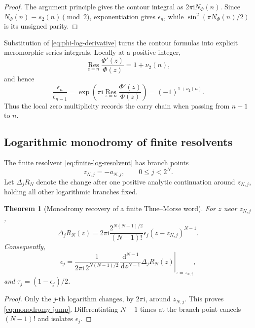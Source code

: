 \documentclass[11pt,oneside]{article}
\newtheorem{theorem}{Theorem}[section]
\theoremstyle{definition}
\newcommand{\dd}{\,\mathrm d}
\newcommand{\ii}{\mathrm i}
\newcommand{\Res}{\operatorname*{Res}}
\newcommand{\vTwo}{\nu_2}
\begin{document}
\begin{proof}
The argument principle gives the contour integral as \(2\pi\ii N_\Phi(n)\). Since
\(N_\Phi(n)\equiv s_2(n)\pmod2\), exponentiation gives \(\epsilon_n\), while
\(\sin^2(\pi N_\Phi(n)/2)\) is its unsigned parity.
\end{proof}

Substitution of \eqref{eq:phi-log-derivative} turns the contour formulas into explicit
meromorphic series integrals. Locally at a positive integer,
\begin{equation}
 \Res_{z=n}\frac{\Phi'(z)}{\Phi(z)}=1+\vTwo(n),
 \label{eq:local-residue}
\end{equation}
and hence
\begin{equation}
 \frac{\epsilon_n}{\epsilon_{n-1}}
 =\exp\left(\pi\ii\Res_{z=n}\frac{\Phi'(z)}{\Phi(z)}\right)
 =(-1)^{1+\vTwo(n)}.
 \label{eq:local-TM-ratio}
\end{equation}
Thus the local zero multiplicity records the carry chain when passing from \(n-1\) to \(n\).

\subsection{Logarithmic monodromy of finite resolvents}

The finite resolvent \eqref{eq:finite-log-resolvent} has branch points
\begin{equation}
 z_{N,j}=-a_{N,j},\qquad 0\le j<2^N.
 \label{eq:branch-points}
\end{equation}
Let \(\Delta_jR_N\) denote the change after one positive analytic continuation around
\(z_{N,j}\), holding all other logarithmic branches fixed.

\begin{theorem}[Monodromy recovery of a finite Thue--Morse word]
\label{thm:monodromy-TM}
For \(z\) near \(z_{N,j}\),
\begin{equation}
 \Delta_jR_N(z)=2\pi\ii\frac{2^{N(N-1)/2}}{(N-1)!}
 \epsilon_j(z-z_{N,j})^{N-1}.
 \label{eq:monodromy-jump}
\end{equation}
Consequently,
\begin{equation}
 \boxed{\displaystyle
 \epsilon_j=\frac{1}{2\pi\ii\,2^{N(N-1)/2}}
 \left.\frac{\dd^{N-1}}{\dd z^{N-1}}\Delta_jR_N(z)\right|_{z=z_{N,j}},}
 \label{eq:epsilon-monodromy}
\end{equation}
and \(\tau_j=(1-\epsilon_j)/2\).
\end{theorem}

\begin{proof}
Only the \(j\)-th logarithm changes, by \(2\pi\ii\), around \(z_{N,j}\). This proves
\eqref{eq:monodromy-jump}. Differentiating \(N-1\) times at the branch point cancels
\((N-1)!\) and isolates \(\epsilon_j\).
\end{proof}
\end{document}
